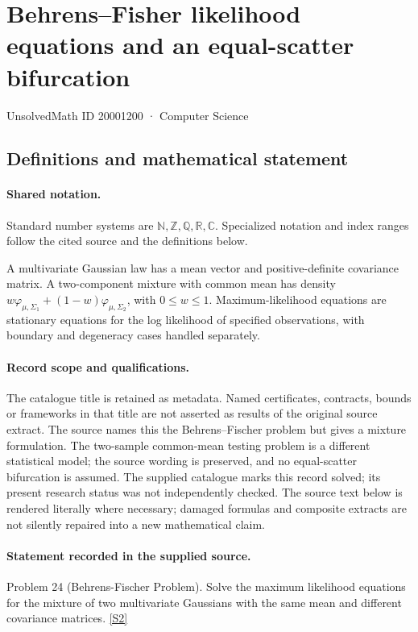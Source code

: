 \documentclass[11pt]{article}
\newcommand{\sref}[2]{\hyperlink{source:#1:#2}{[S#2]}}
\begin{document}
\setcounter{section}{20001199}
\section{Behrens–Fisher likelihood equations and an equal-scatter bifurcation}\label{20001200}
{\small\sffamily UnsolvedMath ID 20001200 · Computer Science}
\subsection{Definitions and mathematical statement}

\paragraph{Shared notation.}Standard number systems are $\mathbb N,\mathbb Z,\mathbb Q,\mathbb R,\mathbb C$. Specialized notation and index ranges follow the cited source and the definitions below.


A multivariate Gaussian law has a mean vector and positive-definite covariance matrix. A two-component mixture with common mean has density $w\varphi_{\mu,\Sigma_1}+(1-w)\varphi_{\mu,\Sigma_2}$, with $0\leq w\leq1$. Maximum-likelihood equations are stationary equations for the log likelihood of specified observations, with boundary and degeneracy cases handled separately.
\paragraph{Record scope and qualifications.}
The catalogue title is retained as metadata. Named certificates, contracts, bounds or frameworks in that title are not asserted as results of the original source extract.
The source names this the Behrens--Fischer problem but gives a mixture formulation. The two-sample common-mean testing problem is a different statistical model; the source wording is preserved, and no equal-scatter bifurcation is assumed. The supplied catalogue marks this record solved; its present research status was not independently checked.
The source text below is rendered literally where necessary; damaged formulas and composite extracts are not silently repaired into a new mathematical claim.
\paragraph{Statement recorded in the supplied source.}
Problem 24 (Behrens-Fischer Problem). Solve the maximum likelihood equations for the mixture of two multivariate Gaussians with the same mean and different covariance matrices. \sref{20001200}{2}
\end{document}
